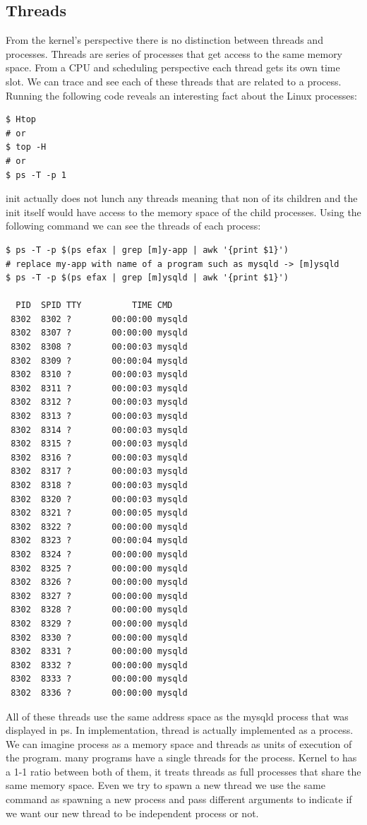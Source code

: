 \documentclass[journal,10pt,onecolumn,compsoc,letterpaper,draftclsnofoot,table,xcdraw]{IEEEtran} \usepackage[margin=0.75in]{geometry}
\begin{document}
\subsection{Threads}
\noindent From the kernel's perspective there is no distinction between threads and processes. Threads are series of processes that get access to the same memory space. From a CPU and scheduling perspective each thread gets its own time slot. We can trace and see each of these threads that are related to a process. Running the following code reveals an interesting fact about the Linux processes:
\begin{verbatim}
$ Htop
# or
$ top -H
# or
$ ps -T -p 1
\end{verbatim}
\noindent init actually does not lunch any threads meaning that non of its children and the init itself would have access to the memory space of the child processes. Using the following command we can see the threads of each process:
\begin{verbatim}
$ ps -T -p $(ps efax | grep [m]y-app | awk '{print $1}')
# replace my-app with name of a program such as mysqld -> [m]ysqld
$ ps -T -p $(ps efax | grep [m]ysqld | awk '{print $1}')

  PID  SPID TTY          TIME CMD
 8302  8302 ?        00:00:00 mysqld
 8302  8307 ?        00:00:00 mysqld
 8302  8308 ?        00:00:03 mysqld
 8302  8309 ?        00:00:04 mysqld
 8302  8310 ?        00:00:03 mysqld
 8302  8311 ?        00:00:03 mysqld
 8302  8312 ?        00:00:03 mysqld
 8302  8313 ?        00:00:03 mysqld
 8302  8314 ?        00:00:03 mysqld
 8302  8315 ?        00:00:03 mysqld
 8302  8316 ?        00:00:03 mysqld
 8302  8317 ?        00:00:03 mysqld
 8302  8318 ?        00:00:03 mysqld
 8302  8320 ?        00:00:03 mysqld
 8302  8321 ?        00:00:05 mysqld
 8302  8322 ?        00:00:00 mysqld
 8302  8323 ?        00:00:04 mysqld
 8302  8324 ?        00:00:00 mysqld
 8302  8325 ?        00:00:00 mysqld
 8302  8326 ?        00:00:00 mysqld
 8302  8327 ?        00:00:00 mysqld
 8302  8328 ?        00:00:00 mysqld
 8302  8329 ?        00:00:00 mysqld
 8302  8330 ?        00:00:00 mysqld
 8302  8331 ?        00:00:00 mysqld
 8302  8332 ?        00:00:00 mysqld
 8302  8333 ?        00:00:00 mysqld
 8302  8336 ?        00:00:00 mysqld

\end{verbatim}
\noindent All of these threads use the same address space as the mysqld process that was displayed in ps. In implementation, thread is actually implemented as a process. We can imagine process as a memory space and threads as units of execution of the program. many programs have a single threads for the process. Kernel to has a 1-1 ratio between both of them, it treats threads as full processes that share the same memory space. Even we try to spawn a new thread we use the same command as spawning a new process and pass different arguments to indicate if we want our new thread to be independent process or not.
\end{document}
